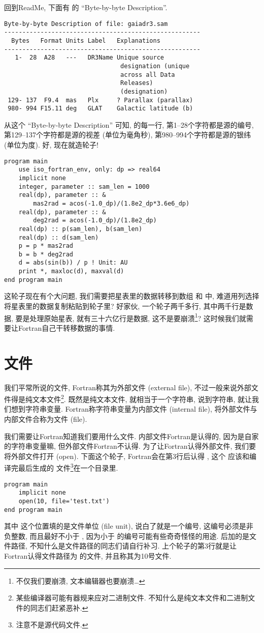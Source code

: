 回到ReadMe, 下面有   的 ``Byte-by-byte Description''. 
\begin{lstlisting}
Byte-by-byte Description of file: gaiadr3.sam 
------------------------------------------------------
  Bytes   Format Units Label   Explanations
------------------------------------------------------
   1-  28  A28   ---   DR3Name Unique source
                                designation (unique
                                across all Data
                                Releases)
                                (designation)
 129- 137  F9.4  mas   Plx     ? Parallax (parallax)
 980- 994 F15.11 deg   GLAT    Galactic latitude (b)
\end{lstlisting}
从这个 ``Byte-by-byte Description'' 可知,  的每一行, 第1--28个字符都是源的编号, 第129--137个字符都是源的视差 (单位为毫角秒), 第980--994个字符都是源的银纬 (单位为度). 好, 现在就造轮子!\label{gaiadr3.sam}
\begin{lstlisting}
program main
    use iso_fortran_env, only: dp => real64
    implicit none
    integer, parameter :: sam_len = 1000
    real(dp), parameter :: &
        mas2rad = acos(-1.0_dp)/(1.8e2_dp*3.6e6_dp)
    real(dp), parameter :: &
        deg2rad = acos(-1.0_dp)/(1.8e2_dp)
    real(dp) :: p(sam_len), b(sam_len)
    real(dp) :: d(sam_len)
    p = p * mas2rad
    b = b * deg2rad
    d = abs(sin(b)) / p ! Unit: AU
    print *, maxloc(d), maxval(d)
end program main
\end{lstlisting}
这轮子现在有个大问题, 我们需要把星表里的数据转移到数组  和  中, 难道用列选择将星表里的数据复制粘贴到轮子里? 好家伙, 一个轮子两千多行, 其中两千行是数据, 要是处理原始星表, 就有三十六亿行是数据, 这不是要崩溃\footnote{不仅我们要崩溃, 文本编辑器也要崩溃\dots{}}? 这时候我们就需要让Fortran自己干转移数据的事情. 

\section{文件}

我们平常所说的文件, Fortran称其为外部文件 (external file), 不过一般来说外部文件得是纯文本文件\footnote{某些编译器可能有器规来应对二进制文件. 不知什么是纯文本文件和二进制文件的同志们赶紧恶补.}. 既然是纯文本文件, 就相当于一个字符串, 说到字符串, 就让我们想到字符串变量. Fortran称字符串变量为内部文件 (internal file), 将外部文件与内部文件合称为文件 (file). 

我们需要让Fortran知道我们要用什么文件. 内部文件Fortran是认得的, 因为是自家的字符串变量嘛, 但外部文件Fortran不认得. 为了让Fortran认得外部文件, 我们要将外部文件打开 (open). 下面这个轮子, Fortran会在第3行后认得 , 这个   应该和编译完最后生成的  文件\footnote{注意不是源代码文件.}在一个目录里. 
\begin{lstlisting}
program main
    implicit none
    open(10, file='test.txt')
end program main
\end{lstlisting}
其中  这个位置填的是文件单位 (file unit), 说白了就是一个编号, 这编号必须是非负整数, 而且最好不小于 , 因为小于  的编号可能有些奇奇怪怪的用途.    后加的是文件路径, 不知什么是文件路径的同志们请自行补习. 上个轮子的第3行就是让Fortran认得文件路径为   的文件, 并且称其为10号文件. 

